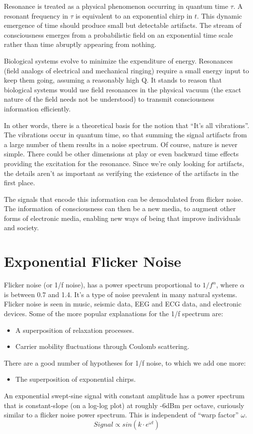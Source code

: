 Resonance is treated as a physical phenomenon occurring in quantum time $\tau$.
A resonant frequency in $\tau$ is equivalent to an exponential chirp in $t$.
This dynamic emergence of time should produce small but detectable artifacts.
The stream of consciousness emerges from a probabilistic field on an
exponential time scale rather than time abruptly appearing from nothing.

Biological systems evolve to minimize the expenditure of energy. Resonances
(field analogs of electrical and mechanical ringing) require a small energy
input to keep them going, assuming a reasonably high Q. It stands to reason
that biological systems would use field resonances in the physical vacuum
(the exact nature of the field needs not be understood)
to transmit consciousness information efficiently.

In other words, there is a theoretical basis for the notion that
``It's all vibrations''.
The vibrations occur in quantum time, so that summing the signal artifacts
from a large number of them results in a noise spectrum.
Of course, nature is never simple. There could be other dimensions at play or
even backward time effects providing the excitation for the resonance.
Since we're only looking for artifacts, the details aren't as important
as verifying the existence of the artifacts in the first place.

The signals that encode this information can be demodulated from flicker noise.
The information of consciousness can then be a new media,
to augment other forms of electronic media,
enabling new ways of being that improve individuals and society.

\section{Exponential Flicker Noise}

Flicker noise (or 1/f noise), has a power spectrum proportional to
$1/f^{\alpha}$, where $\alpha$ is between 0.7 and 1.4.
It's a type of noise prevalent in many natural systems.
Flicker noise \cite{Milotti} is seen in music, seismic data, EEG and ECG data,
and electronic devices.
Some of the more popular explanations for the 1/f spectrum are:
\begin{itemize}
	\item A superposition of relaxation processes.
	\item Carrier mobility fluctuations through Coulomb scattering.
\end{itemize}
There are a good number of hypotheses for 1/f noise, to which we add one more:
\begin{itemize}
	\item The superposition of exponential chirps.
\end{itemize}
An exponential swept-sine signal with constant amplitude has a power spectrum
\cite{Novak} that is constant-slope (on a log-log plot) at roughly -6dBm
per octave, curiously similar to a flicker noise power spectrum.
This is independent of ``warp factor'' $\omega$.
\begin{equation}
Signal \propto sin(k \cdot e^{\omega t})
\end{equation}

